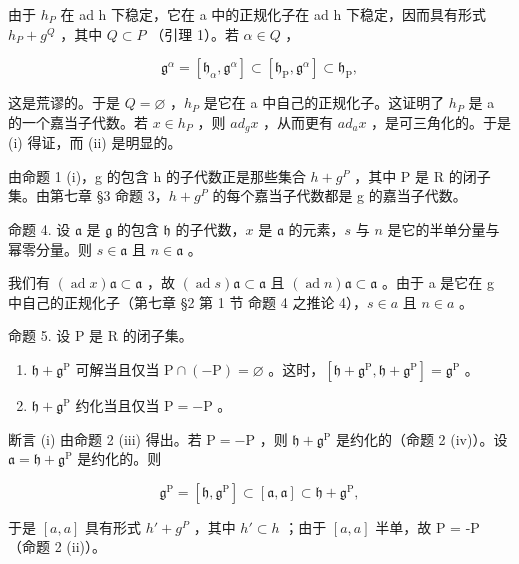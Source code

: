 由于 \(h_{P}\) 在 ad h 下稳定，它在 a 中的正规化子在 ad h 下稳定，因而具有形式 \(h_{P} + g^{Q}\) ，其中 \(Q \subset P\) （引理 1）。若 \(\alpha \in Q\) ，

\[
\mathfrak {g} ^ {\alpha} = \left[ \mathfrak {h} _ {\alpha}, \mathfrak {g} ^ {\alpha} \right] \subset \left[ \mathfrak {h} _ {\mathrm{P}}, \mathfrak {g} ^ {\alpha} \right] \subset \mathfrak {h} _ {\mathrm{P}},
\]

这是荒谬的。于是 \(Q = \varnothing\) ，\(h_{P}\) 是它在 a 中自己的正规化子。这证明了 \(h_{P}\) 是 a 的一个嘉当子代数。若 \(x \in h_{P}\) ，则 \(ad_{g}x\) ，从而更有 \(ad_{a}x\) ，是可三角化的。于是 (i) 得证，而 (ii) 是明显的。

由命题 1 (i)，g 的包含 h 的子代数正是那些集合 \(h + g^{P}\) ，其中 P 是 R 的闭子集。由第七章 §3 命题 3，\(h + g^{P}\) 的每个嘉当子代数都是 g 的嘉当子代数。

命题 4. 设 \(\mathfrak{a}\) 是 \(\mathfrak{g}\) 的包含 \(\mathfrak{h}\) 的子代数，\(x\) 是 \(\mathfrak{a}\) 的元素，\(s\) 与 \(n\) 是它的半单分量与幂零分量。则 \(s \in \mathfrak{a}\) 且 \(n \in \mathfrak{a}\) 。

我们有 \((\operatorname{ad} x)\mathfrak{a} \subset \mathfrak{a}\) ，故 \((\operatorname{ad} s)\mathfrak{a} \subset \mathfrak{a}\) 且 \((\operatorname{ad} n)\mathfrak{a} \subset \mathfrak{a}\) 。由于 a 是它在 g 中自己的正规化子（第七章 §2 第 1 节 命题 4 之推论 4），\(s \in a\) 且 \(n \in a\) 。

命题 5. 设 P 是 R 的闭子集。

\begin{enumerate}
\def\labelenumi{(\roman{enumi})}
\item
  \(\mathfrak{h} + \mathfrak{g}^{\mathrm{P}}\) 可解当且仅当 \(\mathrm{P} \cap (-\mathrm{P}) = \varnothing\) 。这时，\([\mathfrak{h} + \mathfrak{g}^{\mathrm{P}}, \mathfrak{h} + \mathfrak{g}^{\mathrm{P}}] = \mathfrak{g}^{\mathrm{P}}\) 。
\item
  \(\mathfrak{h} + \mathfrak{g}^{\mathrm{P}}\) 约化当且仅当 \(\mathrm{P} = -\mathrm{P}\) 。
\end{enumerate}

断言 (i) 由命题 2 (iii) 得出。若 \(\mathrm{P} = -\mathrm{P}\) ，则 \(\mathfrak{h} + \mathfrak{g}^{\mathrm{P}}\) 是约化的（命题 2 (iv)）。设 \(\mathfrak{a} = \mathfrak{h} + \mathfrak{g}^{\mathrm{P}}\) 是约化的。则

\[
\mathfrak {g} ^ {\mathrm{P}} = \left[ \mathfrak {h}, \mathfrak {g} ^ {\mathrm{P}} \right] \subset \left[ \mathfrak {a}, \mathfrak {a} \right] \subset \mathfrak {h} + \mathfrak {g} ^ {\mathrm{P}},
\]

于是 \([a, a]\) 具有形式 \(h' + g^{P}\) ，其中 \(h' \subset h\) ；由于 \([a, a]\) 半单，故 P = -P （命题 2 (ii)）。

